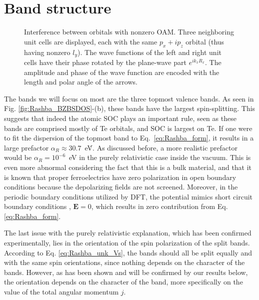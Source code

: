 \section{Band structure}
\begin{figure}[b!]
\caption{\label{fig:interference}Interference between orbitals with nonzero OAM. Three neighboring unit cells are displayed, each with the same $p_x + ip_z$ orbital (thus having nonzero $l_y$). The wave functions of the left and right unit cells have their phase rotated by the plane-wave part $e^{i k_x R_x}$. The amplitude and phase of the wave function are encoded with the length and polar angle of the arrows.}
\end{figure}
The bands we will focus on most are the three topmost valence bands. As seen in Fig. \ref{fig:Rashba_BZBSDOS}-(b), these bands have the largest spin-splitting. This suggests that indeed the atomic SOC plays an important rule, seen as these bands are comprised mostly of Te orbitals, and SOC is largest on Te. If one were to fit the dispersion of the topmost band to Eq.~\ref{eq:Rashba_form},
it results in a large prefactor $\alpha_R\approx 30.7$~eV\.\angstrom \cite{DiSante2013}. As discussed before, a more realistic prefactor would be $\alpha_R=10^{-6}$~eV in the purely relativistic case inside the vacuum.
This is even more abnormal considering the fact that this is a bulk material, and that it is known that proper ferroelectrics have zero polarization in open boundary conditions because the depolarizing fields are not screened. Moreover, in the periodic boundary conditions utilized by DFT, the potential mimics short circuit boundary conditions \cite{Meyer2008}, $\bm E=0$, which results in zero contribution from Eq. \ref{eq:Rashba_form}. 

The last issue with the purely relativistic explanation, which has been confirmed experimentally\cite{Krempasky2015SurfaceSemiconductor}, lies in the orientation of the spin polarization of the split bands. According to Eq. \ref{eq:Rashba_unk_Vs}, the bands should all be split equally and with the same spin orientations, since nothing depends on the character of the bands. However, as has been shown and will be confirmed by our results below, the orientation depends on the character of the band, more specifically on the value of the total angular momentum $j$. 

